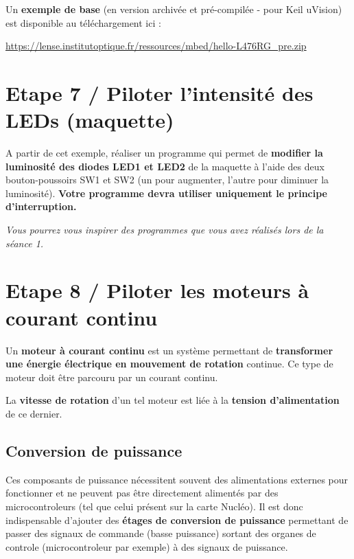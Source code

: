 \documentclass[a4paper,12pt,titlepage]{article} %
\begin{document}
\bigskip

\vfill

Un \textbf{exemple de base} (en version archivée et pré-compilée - pour Keil uVision) est disponible au téléchargement ici : 

\href{https://lense.institutoptique.fr/ressources/mbed/hello-L476RG_pre.zip}{https://lense.institutoptique.fr/ressources/mbed/hello-L476RG\_pre.zip}

\section{Etape 7 / Piloter l'intensité des LEDs (maquette)}

\Manip A partir de cet exemple, réaliser un programme qui permet de \textbf{modifier la luminosité des diodes LED1 et LED2} de la maquette à l'aide des deux bouton-poussoirs SW1 et SW2 (un pour augmenter, l'autre pour diminuer la luminosité). \textbf{Votre programme devra utiliser uniquement le principe d'interruption.}

\medskip

\textit{Vous pourrez vous inspirer des programmes que vous avez réalisés lors de la séance 1.}




\newpage
\section{Etape 8 / Piloter les moteurs à courant continu}

Un \textbf{moteur à courant continu} est un système permettant de \textbf{transformer une énergie électrique en mouvement de rotation} continue. Ce type de moteur doit être parcouru par un courant continu.

La \textbf{vitesse de rotation} d'un tel moteur est liée à la \textbf{tension d'alimentation} de ce dernier. 

\subsection{Conversion de puissance}

Ces composants de puissance nécessitent souvent des alimentations externes pour fonctionner et ne peuvent pas être directement alimentés par des microcontroleurs (tel que celui présent sur la carte Nucléo). Il est donc indispensable d'ajouter des \textbf{étages de conversion de puissance} permettant de passer des signaux de commande (basse puissance) sortant des organes de controle (microcontroleur par exemple) à des signaux de puissance.
\end{document}
